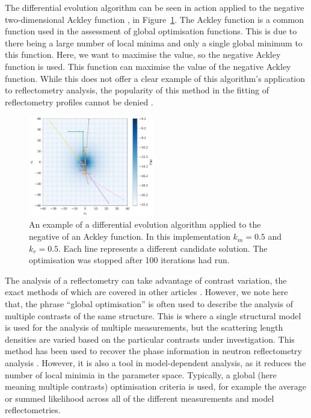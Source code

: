 \documentclass[
 reprint,
 superscriptaddress,
 amsmath,amssymb,
 aps,
]{revtex4-1}
\begin{document}
The differential evolution algorithm can be seen in action applied to the negative two-dimensional Ackley function \cite{ackley_connectionist_1987}, in Figure~\ref{fig:ackley}.
The Ackley function is a common function used in the assessment of global optimisation functions. This is due to there being a large number of local minima and only a single global minimum to this function. Here, we want to maximise the value, so the negative Ackley function is used.
This function can maximise the value of the negative Ackley function.
While this does not offer a clear example of this algorithm's application to reflectometry analysis, the popularity of this method in the fitting of reflectometry profiles cannot be denied \cite{bjorck_fitting_2011,nelson_refnx_2019}.
%
\begin{figure}[t]
    \includegraphics[width=0.49\textwidth]{ackley}
    \caption{An example of a differential evolution algorithm applied to the negative of an Ackley function. In this implementation $k_m=0.5$ and $k_r=0.5$. Each line represents a different candidate solution. The optimisation was stopped after 100 iterations had run.}
    \label{fig:ackley}
\end{figure}
%

The analysis of a reflectometry can take advantage of contrast variation, the exact methods of which are covered in other articles \cite{schurtenberger_contrast_2002}.
However, we note here that, the phrase ``global optimisation'' is often used to describe the analysis of multiple contrasts of the same structure. 
This is where a single structural model is used for the analysis of multiple measurements, but the scattering length densities are varied based on the particular contrasts under investigation. 
This method has been used to recover the phase information in neutron reflectometry analysis \cite{majkrzak_exact_1995,majkrzak_first_2000,majkrzak_phase_2003,koutsioubas_model_2019}.
However, it is also a tool in model-dependent analysis, as it reduces the number of local minimia in the parameter space. 
Typically, a global (here meaning multiple contrasts) optimisation criteria is used, for example the average or summed likelihood across all of the different measurements and model reflectometries. 
\end{document}

